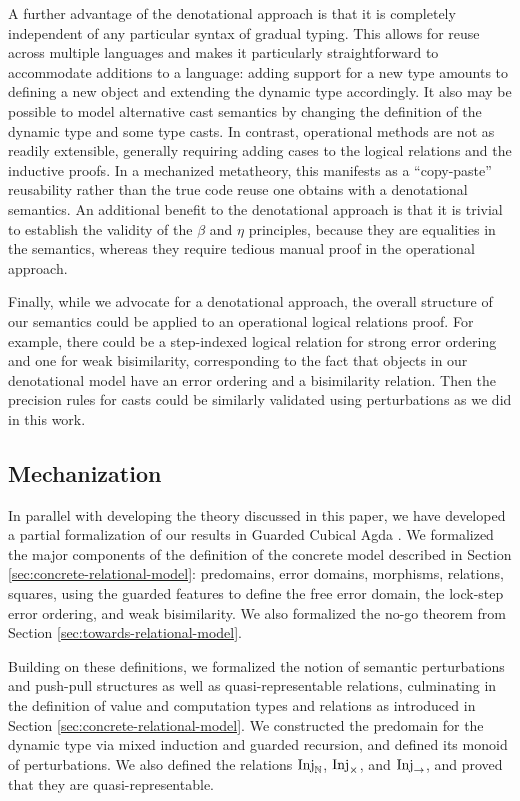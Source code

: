 A further advantage of the denotational approach is that it is completely
independent of any particular syntax of gradual typing. This allows for reuse
across multiple languages and makes it particularly straightforward to
accommodate additions to a language: adding support for a new type amounts to
defining a new object and extending the dynamic type accordingly. It also may be
possible to model alternative cast semantics by changing the definition of the
dynamic type and some type casts.
%
In contrast, operational methods are not as readily extensible, generally
requiring adding cases to the logical relations and the inductive proofs. In a
mechanized metatheory, this manifests as a ``copy-paste'' reusability rather than
the true code reuse one obtains with a denotational semantics.
%
An additional benefit to the denotational approach is that it is trivial to
establish the validity of the $\beta$ and $\eta$ principles, because they are
equalities in the semantics, whereas they require tedious manual proof in the
operational approach.

Finally, while we advocate for a denotational approach, the overall structure of
our semantics could be applied to an operational logical relations proof. For
example, there could be a step-indexed logical relation for strong error
ordering and one for weak bisimilarity, corresponding to the fact that objects
in our denotational model have an error ordering and a bisimilarity relation.
Then the precision rules for casts could be similarly validated using
perturbations as we did in this work.


\subsection{Mechanization}\label{sec:mechanization}
In parallel with developing the theory discussed in this paper, we have
developed a partial formalization of our results in Guarded Cubical Agda
\cite{veltri-vezzosi2020}.
%
We formalized the major components of the definition of the concrete model
described in Section \ref{sec:concrete-relational-model}: predomains, error
domains, morphisms, relations, squares, using the guarded
features to define the free error domain, the lock-step error ordering, and weak
bisimilarity. We also formalized the no-go theorem from Section
\ref{sec:towards-relational-model}.

Building on these definitions, we formalized the notion of semantic
perturbations and push-pull structures as well as quasi-representable relations,
culminating in the definition of value and computation types and relations as
introduced in Section \ref{sec:concrete-relational-model}.
%
%
We constructed the predomain for the dynamic type via mixed induction and
guarded recursion, and defined its monoid of perturbations. We also defined the
relations $\text{Inj}_\mathbb{N}$, $\text{Inj}_\times$, and $\text{Inj}_\to$, and proved that they are
quasi-representable.

